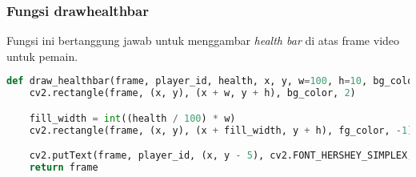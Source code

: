 \documentclass[11pt,a4paper]{article}
\begin{document}
\subsubsection{Fungsi draw\textunderscore healthbar}
Fungsi ini bertanggung jawab untuk menggambar \textit{health bar} di atas frame video untuk pemain.
\begin{lstlisting}[language=Python, caption=draw\textunderscore healthbar]
def draw_healthbar(frame, player_id, health, x, y, w=100, h=10, bg_color=(0, 0, 0), fg_color=(0, 255, 0)):
    cv2.rectangle(frame, (x, y), (x + w, y + h), bg_color, 2)

    fill_width = int((health / 100) * w)
    cv2.rectangle(frame, (x, y), (x + fill_width, y + h), fg_color, -1)

    cv2.putText(frame, player_id, (x, y - 5), cv2.FONT_HERSHEY_SIMPLEX, 0.5, (255, 255, 255), 1)
    return frame
\end{lstlisting}
\end{document}

